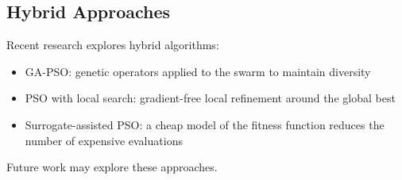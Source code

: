 \subsection{Hybrid Approaches}
Recent research explores hybrid algorithms:
\begin{itemize}
\item GA-PSO: genetic operators applied to the swarm to maintain diversity
\item PSO with local search: gradient-free local refinement around the global best
\item Surrogate-assisted PSO: a cheap model of the fitness function reduces the number of expensive evaluations
\end{itemize}
Future work may explore these approaches.
